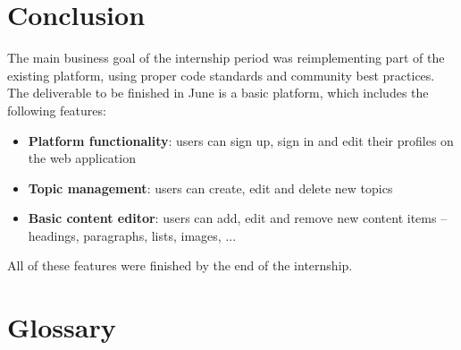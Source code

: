 \documentclass[10pt,a4paper]{article}
\newcommand{\jasper}[1]{\ifthenelse{\isundefined{\isjasper}}{}{#1}}
\begin{document}
    \jasper{
    }

  \section{Conclusion}

    The main business goal of the internship period was reimplementing part of the existing platform, using proper code standards and community best practices.
    The deliverable to be finished in June is a basic platform, which includes the following features:
    
    \begin{itemize}
      \item \textbf{Platform functionality}: users can sign up, sign in and edit their profiles on the web application
      \item \textbf{Topic management}: users can create, edit and delete new topics
      \item \textbf{Basic content editor}: users can add, edit and remove new content items -- headings, paragraphs, lists, images, ...
    \end{itemize}
  
    All of these features were finished by the end of the internship.
    
  \section*{Glossary}

  \printbibliography[heading=bibintoc]
\end{document}
